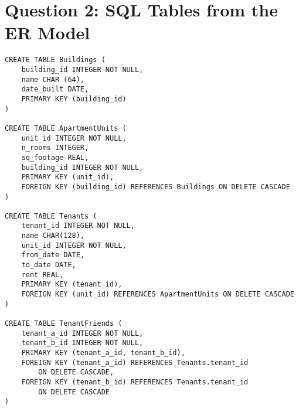 \documentclass{article}
\begin{document}
\newpage

\section*{Question 2: SQL Tables from the ER Model}

\begin{verbatim}
CREATE TABLE Buildings (
    building_id INTEGER NOT NULL,
    name CHAR (64),
    date_built DATE,
    PRIMARY KEY (building_id)
)

CREATE TABLE ApartmentUnits (
    unit_id INTEGER NOT NULL,
    n_rooms INTEGER,
    sq_footage REAL,
    building_id INTEGER NOT NULL,
    PRIMARY KEY (unit_id),
    FOREIGN KEY (building_id) REFERENCES Buildings ON DELETE CASCADE
)

CREATE TABLE Tenants (
    tenant_id INTEGER NOT NULL,
    name CHAR(128),
    unit_id INTEGER NOT NULL,
    from_date DATE,
    to_date DATE,
    rent REAL,
    PRIMARY KEY (tenant_id),
    FOREIGN KEY (unit_id) REFERENCES ApartmentUnits ON DELETE CASCADE
)

CREATE TABLE TenantFriends (
    tenant_a_id INTEGER NOT NULL,
    tenant_b_id INTEGER NOT NULL,
    PRIMARY KEY (tenant_a_id, tenant_b_id),
    FOREIGN KEY (tenant_a_id) REFERENCES Tenants.tenant_id
        ON DELETE CASCADE,
    FOREIGN KEY (tenant_b_id) REFERENCES Tenants.tenant_id
        ON DELETE CASCADE
)
\end{verbatim}
\end{document}
